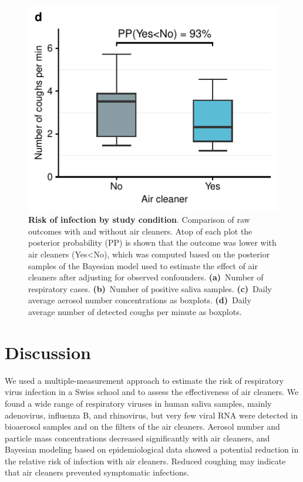 \documentclass[fleqn,11pt]{wlscirep}
\begin{document}
\begin{figure}[!htpb]
    \includegraphics{../../results/cough-data/coughs-frequency-by-condition.pdf}
    \caption{\textbf{Risk of infection by study condition}. Comparison of raw outcomes with and without air cleaners. Atop of each plot the posterior probability (PP) is shown that the outcome was lower with air cleaners (Yes<No), which was computed based on the posterior samples of the Bayesian model used to estimate the effect of air cleaners after adjusting for observed confounders. \textbf{(a)}~Number of respiratory cases. \textbf{(b)}~Number of positive saliva samples. \textbf{(c)}~Daily average aerosol number concentrations as boxplots. \textbf{(d)}~Daily average number of detected coughs per minute as boxplots. }
    \label{fig:infection-risk}
\end{figure}

\FloatBarrier

\newpage

\section{Discussion}


We used a multiple-measurement approach to estimate the risk of respiratory virus infection in a Swiss school and to assess the effectiveness of air cleaners. We found a wide range of respiratory viruses in human saliva samples, mainly adenovirus, influenza B, and rhinovirus, but very few viral RNA were detected in bioaerosol samples and on the filters of the air cleaners. Aerosol number and particle mass concentrations decreased significantly with air cleaners, and Bayesian modeling based on epidemiological data showed a potential reduction in the relative risk of infection with air cleaners. Reduced coughing may indicate that air cleaners prevented symptomatic infections.
\end{document}
